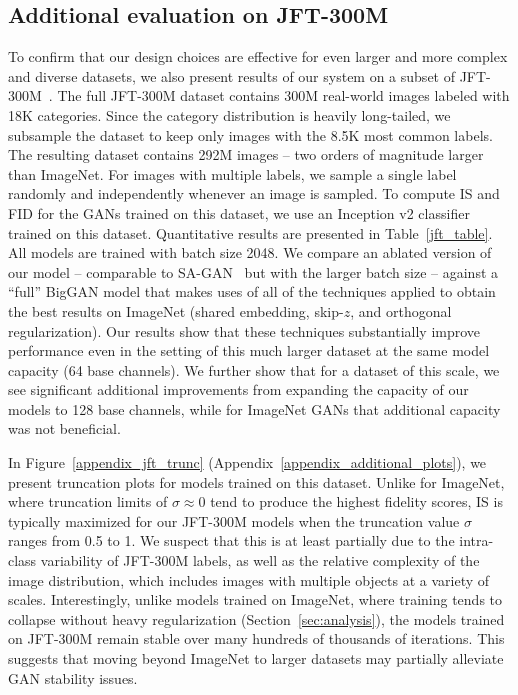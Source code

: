 \documentclass{article} %
\begin{document}

\subsection{Additional evaluation on JFT-300M}
To confirm that our design choices are effective for even larger and more complex and diverse datasets, we also present results of our system on a subset of JFT-300M~\citep{sun17revisiting}.
The full JFT-300M dataset contains 300M real-world images labeled with 18K categories.
Since the category distribution is heavily long-tailed, we subsample the dataset to keep only images with the 8.5K most common labels.
The resulting dataset contains 292M images -- two orders of magnitude larger than ImageNet. For images with multiple labels, we sample a single label randomly and independently whenever an image is sampled.
To compute IS and FID for the GANs trained on this dataset, we use an Inception v2 classifier~\citep{szegedy2015rethinking} trained on this dataset.
Quantitative results are presented in Table~\ref{jft_table}.
All models are trained with batch size 2048.
We compare an ablated version of our model --
comparable to SA-GAN~\citep{zhang2018sagan} but with the larger batch size --
against a ``full'' BigGAN model that makes uses of all of the techniques applied to obtain the best results on ImageNet (shared embedding, skip-$z$, and orthogonal regularization).
Our results show that these techniques substantially improve performance even in the setting of this much larger dataset at the same model capacity (64 base channels).
We further show that for a dataset of this scale, we see significant additional improvements from expanding the capacity of our models to 128 base channels, while for ImageNet GANs that additional capacity was not beneficial.
 
In Figure~\ref{appendix_jft_trunc} (Appendix~\ref{appendix_additional_plots}), we present truncation plots for models trained on this dataset.
Unlike for ImageNet, where truncation limits of $\sigma\approx0$ tend to produce the highest fidelity scores, IS is typically maximized for our JFT-300M models when the truncation value $\sigma$ ranges from 0.5 to 1.
We suspect that this is at least partially due to the intra-class variability of JFT-300M labels, as well as the relative complexity of the image distribution, which includes images with multiple objects at a variety of scales.
Interestingly, unlike models trained on ImageNet, where training tends to collapse without heavy regularization (Section~\ref{sec:analysis}), the models trained on JFT-300M remain stable over many hundreds of thousands of iterations.
This suggests that moving beyond ImageNet to larger datasets may partially alleviate GAN stability issues.
\end{document}
